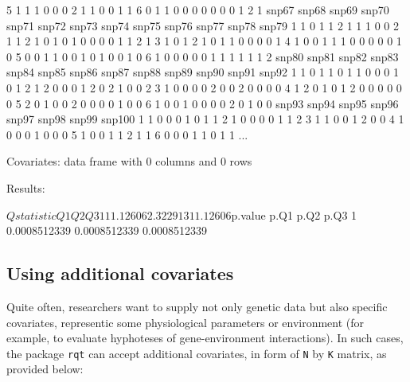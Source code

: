 \documentclass{article}
\begin{document}
\begin{Schunk}
\begin{Soutput}
5     1     1     1     0     0     0     2     1     1     0     0     1     1
6     0     1     1     0     0     0     0     0     0     0     1     2     1
  snp67 snp68 snp69 snp70 snp71 snp72 snp73 snp74 snp75 snp76 snp77 snp78 snp79
1     1     0     1     1     2     1     1     1     0     0     2     1     1
2     1     0     1     0     1     0     0     0     0     1     1     2     1
3     1     0     1     2     1     0     1     1     0     0     0     0     1
4     1     0     0     1     1     1     0     0     0     0     0     1     0
5     0     0     1     1     0     0     1     0     1     0     0     1     0
6     1     0     0     0     0     0     1     1     1     1     1     1     2
  snp80 snp81 snp82 snp83 snp84 snp85 snp86 snp87 snp88 snp89 snp90 snp91 snp92
1     1     0     1     1     0     1     1     0     0     0     1     0     1
2     1     2     0     0     0     1     2     0     2     1     0     0     2
3     1     0     0     0     0     2     0     0     2     0     0     0     0
4     1     2     0     1     0     1     2     0     0     0     0     0     0
5     2     0     1     0     0     2     0     0     0     0     1     0     0
6     1     0     0     1     0     0     0     0     2     0     1     0     0
  snp93 snp94 snp95 snp96 snp97 snp98 snp99 snp100
1     1     0     0     0     1     0     1      1
2     1     0     0     0     0     1     1      2
3     1     1     0     0     1     2     0      0
4     1     0     0     0     1     0     0      0
5     1     0     0     1     1     2     1      1
6     0     0     0     1     1     0     1      1
...

Covariates:
data frame with 0 columns and 0 rows


Results:

$Qstatistic
        Q1       Q2       Q3
1 11.12606 2.322913 11.12606

$p.value
          p.Q1         p.Q2         p.Q3
1 0.0008512339 0.0008512339 0.0008512339
\end{Soutput}
\end{Schunk}

\subsection{Using additional covariates}

Quite often, researchers want to supply not only genetic 
data but also specific covariates, 
representic some physiological parameters or environment 
(for example, to evaluate 
hyphoteses of gene-environment interactions). 
In such cases, the package \texttt{rqt} 
can accept additional covariates, in form of 
\texttt{N} by \texttt{K} matrix, as provided below:
\end{document}
